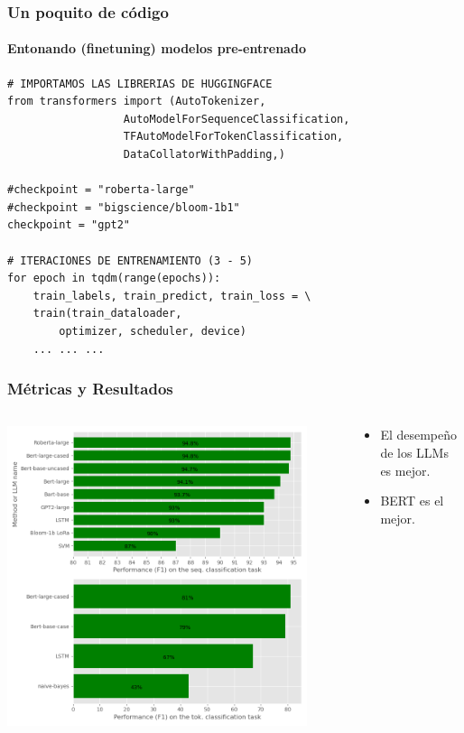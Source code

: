 \documentclass[10pt]{beamer}
\begin{document}
\begin{frame}[containsverbatim]
    \frametitle{Un poquito de código}
    \framesubtitle{Entonando (finetuning) modelos pre-entrenado}
    \begin{verbatim}
# IMPORTAMOS LAS LIBRERIAS DE HUGGINGFACE
from transformers import (AutoTokenizer,
                  AutoModelForSequenceClassification,
                  TFAutoModelForTokenClassification,
                  DataCollatorWithPadding,)

#checkpoint = "roberta-large"
#checkpoint = "bigscience/bloom-1b1"
checkpoint = "gpt2"

# ITERACIONES DE ENTRENAMIENTO (3 - 5)
for epoch in tqdm(range(epochs)):
    train_labels, train_predict, train_loss = \
    train(train_dataloader,
        optimizer, scheduler, device)
    ... ... ...
    \end{verbatim}
\end{frame}

\begin{frame}
    \frametitle{Métricas y Resultados}
    \begin{columns}
        \begin{column}{0.7\textwidth}
            \begin{center}
                \includegraphics[width=0.9\textwidth]{../Images/taskbars.png}
            \end{center}
        \end{column}
        \begin{column}{0.3\textwidth}
            \begin{itemize}
                \item El desempeño de los LLMs es mejor.
                    \pause
                \item BERT es el mejor.
            \end{itemize}
        \end{column}
    \end{columns}
\end{frame}
\end{document}
